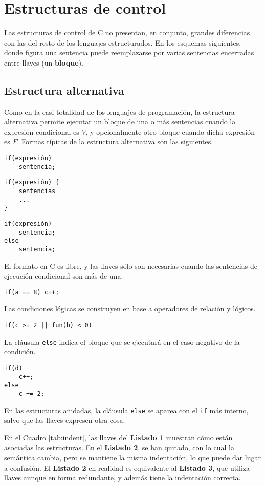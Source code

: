 

\chapter{Estructuras de control}

Las estructuras de control de C no presentan, en conjunto, grandes diferencias
con las del resto de los lenguajes estructurados. En los esquemas siguientes, donde figura una sentencia puede reemplazarse por
varias sentencias encerradas entre llaves (un \textbf{bloque}).

\section{Estructura alternativa}

Como en la casi totalidad de los lenguajes de programación, la estructura alternativa permite ejecutar un bloque de una o más sentencias cuando la expresión condicional es $V$, y opcionalmente otro bloque cuando dicha expresión es $F$.
Formas típicas de la estructura alternativa son las siguientes.

\begin{lstlisting}
if(expresión)
    sentencia;
\end{lstlisting}

\begin{lstlisting}
if(expresión) {
    sentencias
    ...
}
\end{lstlisting}

\begin{lstlisting}
if(expresión)
    sentencia;
else
    sentencia;
\end{lstlisting}

\begin{ejemplo}
El formato en C es libre, y las llaves sólo son necesarias cuando las sentencias de ejecución condicional son más de una. 
\begin{lstlisting}
if(a == 8) c++;
\end{lstlisting}
Las condiciones lógicas se construyen en base a operadores de relación y lógicos. 
\begin{lstlisting}
if(c >= 2 || fun(b) < 0)
\end{lstlisting}
La cláusula \lstinline{else} indica el bloque que se ejecutará en el caso negativo de la condición. 
\begin{lstlisting}
if(d)
	c++;
else
	c += 2;
\end{lstlisting}
En las estructuras anidadas, la cláusula \lstinline{else} se aparea
con el \lstinline{if} más interno, salvo que las llaves expresen otra cosa. 

En el Cuadro \ref{tab:indent}, las llaves del \textbf{Listado 1} muestran cómo están asociadas las estructuras. En el \textbf{Listado 2}, se han quitado, con lo cual la semántica cambia, pero se mantiene la misma indentación, lo que puede dar lugar a confusión. El \textbf{Listado 2} en realidad es equivalente al \textbf{Listado 3}, que utiliza llaves aunque en forma redundante, y además tiene la indentación correcta.
\end{ejemplo}

